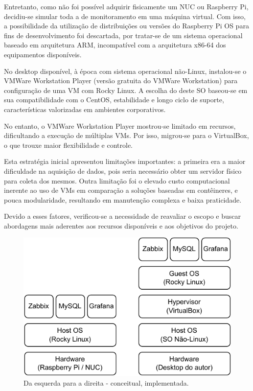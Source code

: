 Entretanto, como não foi possível adquirir fisicamente um NUC ou Raspberry Pi, decidiu-se simular toda a  de monitoramento em uma máquina virtual. Com isso, a possibilidade da utilização de distribuições ou versões do Raspberry Pi OS para fins de desenvolvimento foi descartada, por tratar-se de um sistema operacional baseado em arquitetura ARM, incompatível com a arquitetura x86-64 dos equipamentos disponíveis.

No desktop disponível, à época com sistema operacional não-Linux, instalou-se o VMWare Workstation Player (versão gratuita do VMWare Workstation) para configuração de uma VM com Rocky Linux. A escolha do deste SO baseou-se em sua compatibilidade com o CentOS, estabilidade e longo ciclo de suporte, características valorizadas em ambientes corporativos.

No entanto, o VMWare Workstation Player mostrou-se limitado em recursos, dificultando a execução de múltiplas VMs. Por isso, migrou-se para o VirtualBox, o que trouxe maior flexibilidade e controle.

Esta estratégia inicial apresentou limitações importantes: a primeira era a maior dificuldade na aquisição de dados, pois seria necessário obter um servidor físico para coleta dos mesmos. Outra limitação foi o elevado custo computacional inerente ao uso de VMs em comparação a soluções baseadas em contêineres, e pouca modularidade, resultando em manutenção complexa e baixa praticidade.

Devido a esses fatores, verificou-se a necessidade de reavaliar o escopo e buscar abordagens mais aderentes aos recursos disponíveis e aos objetivos do projeto.

\begin{figure}[H]
\centering
\includegraphics[scale=1]{Imagens/chap03/v0xv1_stack.pdf}
\caption{Da esquerda para a direita -  conceitual,  implementada.}
\label{fig:StackImplementada}
\end{figure}

